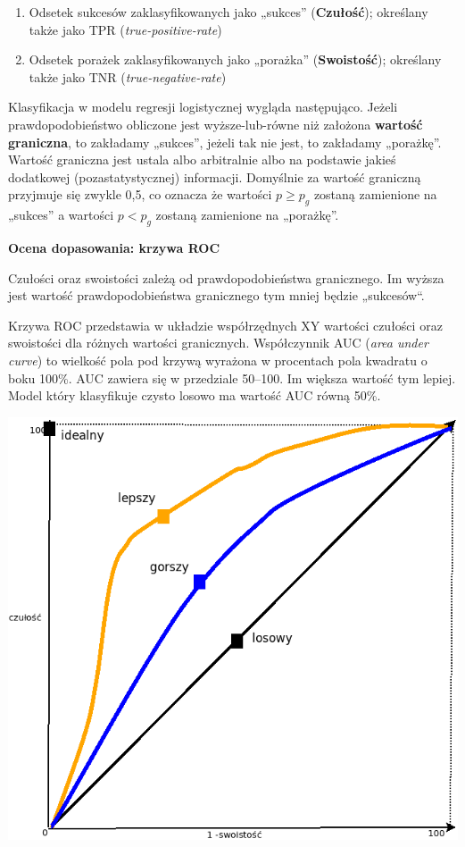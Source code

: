 \documentclass[
  openany]{book}
\providecommand{\tightlist}{%
  \setlength{\itemsep}{0pt}\setlength{\parskip}{0pt}}
\begin{document}
\begin{enumerate}
\def\labelenumi{\arabic{enumi}.}
\tightlist
\item
  Odsetek sukcesów zaklasyfikowanych jako „sukces'' (\textbf{Czułość}); określany
  także jako TPR (\emph{true-positive-rate})
\item
  Odsetek porażek zaklasyfikowanych jako „porażka'' (\textbf{Swoistość});
  określany także jako TNR (\emph{true-negative-rate})
\end{enumerate}

Klasyfikacja w modelu regresji logistycznej wygląda następująco.
Jeżeli prawdopodobieństwo obliczone
jest wyższe-lub-równe niż założona \textbf{wartość graniczna}, to zakładamy „sukces'',
jeżeli tak nie jest, to zakładamy „porażkę''.
Wartość graniczna jest ustala albo
arbitralnie albo na podstawie jakieś dodatkowej (pozastatystycznej) informacji.
Domyślnie za wartość graniczną przyjmuje się zwykle 0,5, co oznacza że
wartości \(p \geq p_g\) zostaną zamienione na „sukces''
a wartości \(p < p_g\) zostaną zamienione na „porażkę''.

\textbf{Ocena dopasowania: krzywa ROC}

Czułości oraz swoistości zależą od prawdopodobieństwa granicznego.
Im wyższa
jest wartość prawdopodobieństwa granicznego tym mniej będzie „sukcesów``.

Krzywa ROC przedstawia w układzie współrzędnych XY wartości
czułości oraz swoistości dla różnych wartości granicznych.
Współczynnik AUC (\emph{area under curve}) to wielkość pola pod
krzywą wyrażona w procentach pola kwadratu o boku 100\%.
AUC zawiera się w przedziale 50--100. Im większa wartość tym lepiej.
Model który klasyfikuje czysto losowo ma wartość AUC równą 50\%.

\includegraphics{./ROCcurve.png}
\end{document}
